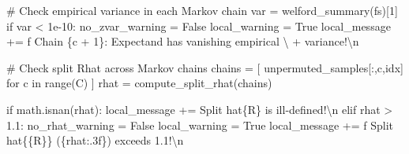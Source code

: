 \documentclass[
  letterpaper,
  DIV=11,
  numbers=noendperiod]{scrartcl}
\newenvironment{Shaded}{\begin{snugshade}}{\end{snugshade}}
\newcommand{\BuiltInTok}[1]{\textcolor[rgb]{0.00,0.23,0.31}{#1}}
\newcommand{\CharTok}[1]{\textcolor[rgb]{0.13,0.47,0.30}{#1}}
\newcommand{\CommentTok}[1]{\textcolor[rgb]{0.37,0.37,0.37}{#1}}
\newcommand{\ControlFlowTok}[1]{\textcolor[rgb]{0.00,0.23,0.31}{#1}}
\newcommand{\DecValTok}[1]{\textcolor[rgb]{0.68,0.00,0.00}{#1}}
\newcommand{\FloatTok}[1]{\textcolor[rgb]{0.68,0.00,0.00}{#1}}
\newcommand{\KeywordTok}[1]{\textcolor[rgb]{0.00,0.23,0.31}{#1}}
\newcommand{\NormalTok}[1]{\textcolor[rgb]{0.00,0.23,0.31}{#1}}
\newcommand{\OperatorTok}[1]{\textcolor[rgb]{0.37,0.37,0.37}{#1}}
\newcommand{\SpecialCharTok}[1]{\textcolor[rgb]{0.37,0.37,0.37}{#1}}
\newcommand{\SpecialStringTok}[1]{\textcolor[rgb]{0.13,0.47,0.30}{#1}}
\newcommand{\StringTok}[1]{\textcolor[rgb]{0.13,0.47,0.30}{#1}}
\newcommand{\VariableTok}[1]{\textcolor[rgb]{0.07,0.07,0.07}{#1}}
\begin{document}
\begin{Shaded}
\begin{Highlighting}[]
      \CommentTok{\# Check empirical variance in each Markov chain}
\NormalTok{      var }\OperatorTok{=}\NormalTok{ welford\_summary(fs)[}\DecValTok{1}\NormalTok{]}
      \ControlFlowTok{if}\NormalTok{ var }\OperatorTok{\textless{}} \FloatTok{1e{-}10}\NormalTok{:}
\NormalTok{        no\_zvar\_warning }\OperatorTok{=} \VariableTok{False}
\NormalTok{        local\_warning }\OperatorTok{=} \VariableTok{True}
\NormalTok{        local\_message }\OperatorTok{+=} \SpecialStringTok{f\textquotesingle{}  Chain }\SpecialCharTok{\{}\NormalTok{c }\OperatorTok{+} \DecValTok{1}\SpecialCharTok{\}}\SpecialStringTok{: Expectand has vanishing empirical\textquotesingle{}}\NormalTok{ \textbackslash{}}
                        \OperatorTok{+} \StringTok{\textquotesingle{} variance!}\CharTok{\textbackslash{}n}\StringTok{\textquotesingle{}}
    
    \CommentTok{\# Check split Rhat across Markov chains}
\NormalTok{    chains }\OperatorTok{=}\NormalTok{ [ unpermuted\_samples[:,c,idx] }\ControlFlowTok{for}\NormalTok{ c }\KeywordTok{in} \BuiltInTok{range}\NormalTok{(C) ]}
\NormalTok{    rhat }\OperatorTok{=}\NormalTok{ compute\_split\_rhat(chains)}

    \ControlFlowTok{if}\NormalTok{ math.isnan(rhat):}
\NormalTok{      local\_message }\OperatorTok{+=} \StringTok{\textquotesingle{}  Split hat}\SpecialCharTok{\{R\}}\StringTok{ is ill{-}defined!}\CharTok{\textbackslash{}n}\StringTok{\textquotesingle{}}
    \ControlFlowTok{elif}\NormalTok{ rhat }\OperatorTok{\textgreater{}} \FloatTok{1.1}\NormalTok{:}
\NormalTok{      no\_rhat\_warning }\OperatorTok{=} \VariableTok{False}
\NormalTok{      local\_warning }\OperatorTok{=} \VariableTok{True}
\NormalTok{      local\_message }\OperatorTok{+=} \SpecialStringTok{f\textquotesingle{}  Split hat}\CharTok{\{\{}\SpecialStringTok{R}\CharTok{\}\}}\SpecialStringTok{ (}\SpecialCharTok{\{}\NormalTok{rhat}\SpecialCharTok{:.3f\}}\SpecialStringTok{) exceeds 1.1!}\CharTok{\textbackslash{}n}\SpecialStringTok{\textquotesingle{}}


\end{Highlighting}
\end{Shaded}
\end{document}
